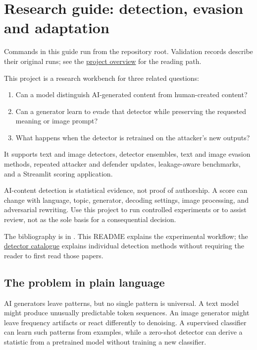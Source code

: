\section{Research guide: detection, evasion and
adaptation}\label{record-docs-research-guide-md-research-guide-detection-evasion-and-adaptation}

Commands in this guide run from the repository root. Validation records
describe their original runs; see the \href{../README.md}{project
overview} for the reading path.

This project is a research workbench for three related questions:

\begin{enumerate}
\def\labelenumi{\arabic{enumi}.}
\tightlist
\item
  Can a model distinguish AI-generated content from human-created
  content?
\item
  Can a generator learn to evade that detector while preserving the
  requested meaning or image prompt?
\item
  What happens when the detector is retrained on the attacker's new
  outputs?
\end{enumerate}

It supports text and image detectors, detector ensembles, text and image
evasion methods, repeated attacker and defender updates, leakage-aware
benchmarks, and a Streamlit scoring application.

AI-content detection is statistical evidence, not proof of authorship. A
score can change with language, topic, generator, decoding settings,
image processing, and adversarial rewriting. Use this project to run
controlled experiments or to assist review, not as the sole basis for a
consequential decision.

The bibliography is in
\href{../ai_content_detector/references.bib}{\texttt{}}.
This README explains the experimental workflow; the
\href{records/DETECTORS.tex}{detector catalogue} explains individual
detection methods without requiring the reader to first read those
papers.

\subsection{The problem in plain
language}\label{record-docs-research-guide-md-the-problem-in-plain-language}

AI generators leave patterns, but no single pattern is universal. A text
model might produce unusually predictable token sequences. An image
generator might leave frequency artifacts or react differently to
denoising. A supervised classifier can learn such patterns from
examples, while a zero-shot detector can derive a statistic from a
pretrained model without training a new classifier.

